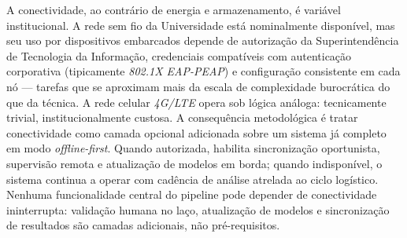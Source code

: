 A conectividade, ao contrário de energia e armazenamento, é variável institucional. A rede sem fio da Universidade está nominalmente disponível, mas seu uso por dispositivos embarcados depende de autorização da Superintendência de Tecnologia da Informação, credenciais compatíveis com autenticação corporativa (tipicamente \emph{802.1X EAP-PEAP}) e configuração consistente em cada nó --- tarefas que se aproximam mais da escala de complexidade burocrática do que da técnica. A rede celular \emph{4G/LTE} opera sob lógica análoga: tecnicamente trivial, institucionalmente custosa. A consequência metodológica é tratar conectividade como camada opcional adicionada sobre um sistema já completo em modo \emph{offline-first}. Quando autorizada, habilita sincronização oportunista, supervisão remota e atualização de modelos em borda; quando indisponível, o sistema continua a operar com cadência de análise atrelada ao ciclo logístico. Nenhuma funcionalidade central do pipeline pode depender de conectividade ininterrupta: validação humana no laço, atualização de modelos e sincronização de resultados são camadas adicionais, não pré-requisitos.
